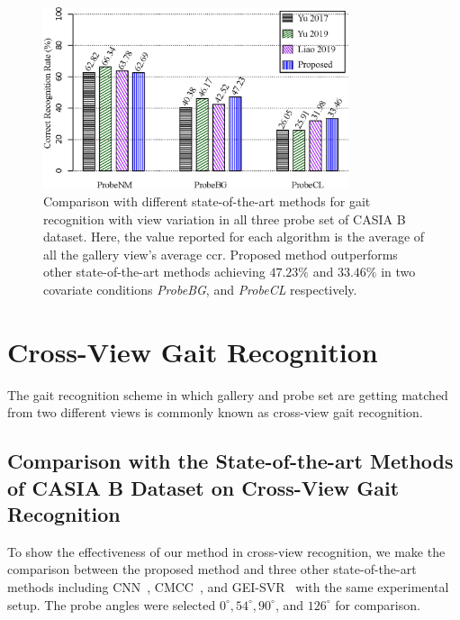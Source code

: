 \begin{figure}
	\centering
	\includegraphics[width = 0.8\textwidth]{figures/comp_casia_b_with_view.eps}
	\caption [Comparison with different state-of-the-art methods for gait recognition with view variation in all three probe set of CASIA B dataset]
	{Comparison with different state-of-the-art methods for gait recognition with view variation in all three probe set of CASIA B dataset. Here, the value reported for each algorithm is the average of all the gallery view's average \gls{ccr}. Proposed method outperforms other state-of-the-art methods achieving $47.23\%$ and $33.46\%$ in two covariate conditions \textit{ProbeBG}, and \textit{ProbeCL} respectively.   \label{fig:comp_casia_b_with_view}
	}
	
\end{figure}




\section{Cross-View Gait Recognition}
The gait recognition scheme in which gallery and probe set are getting matched from two different views is commonly known as cross-view gait recognition.

\subsection{Comparison with the State-of-the-art Methods of CASIA B Dataset on Cross-View Gait Recognition}
To show the effectiveness of our method in cross-view recognition, we make the comparison between the proposed method and three other state-of-the-art methods including CNN~\cite{Wu_17}, CMCC~\cite{Kusakunniran_14}, and GEI-SVR~\cite{Kusakunniran_10} with the same experimental setup. The probe angles were selected $0^{\circ}, 54^{\circ}, 90^{\circ}$, and $126^{\circ}$ for comparison. 

